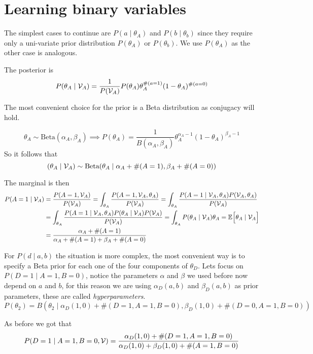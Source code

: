 \section{Learning binary variables}

The simplest cases to continue are \(P(a\mid \theta_{A})\) and
\(P(b \mid \theta_{b})\) since they require only a uni-variate prior distribution
\(P(\theta_{A})\) or \(P(\theta_{b})\). We use \(P(\theta_{A})\) as the other
case is analogous.

The posterior is
\[
  P(\theta_{A} \mid \mathcal{V}_{A}) = \frac{1}{P(\mathcal{V}_{A})}P(\theta_{A})\theta_{A}^{\#(a=1)}(1-\theta_{A})^{\#(a=0)}
\]

The most convenient choice for the prior is a Beta distribution as conjugacy
will hold.

\[
  \theta_{A} \sim \text{Beta}(\alpha_{A}, \beta_{A}) \implies P(\theta_{A})  = \frac{1}{B(\alpha_{A}, \beta_{A})}\theta_{A}^{\alpha_{A}-1}(1-\theta_{A})^{\beta_{A} - 1}
\]
So it follows that
\[
  (\theta_{A} \mid \mathcal{V}_{A}) \sim \text{Beta}(\theta_{A} \mid \alpha_{A} + \#(A=1), \beta_{A} + \#(A = 0))
\]

The marginal is then
\[
  \begin{aligned}
    P(A = 1 \mid \mathcal{V}_{A})
    &= \frac{P(A = 1, \mathcal{V}_{A})}{P(\mathcal{V}_{A})} = \int_{\theta_{A}}  \frac{P(A = 1, \mathcal{V}_{A}, \theta_{A})}{P(\mathcal{V}_{A})} =  \int_{\theta_{A}}  \frac{P(A = 1 \mid \mathcal{V}_{A}, \theta_{A}) P(\mathcal{V}_{A}, \theta_{A})}{P(\mathcal{V}_{A})} \\
    &=  \int_{\theta_{A}}  \frac{P(A = 1 \mid \mathcal{V}_{A}, \theta_{A}) P(\theta_{A} \mid \mathcal{V}_{A})P(\mathcal{V}_{A})}{P(\mathcal{V}_{A})} = \int_{\theta_{A}}P(\theta_{A}\mid \mathcal{V}_{A})\theta_{A} = \mathbb{E}_{}\Big[\theta_{A} \mid \mathcal{V}_{A}\Big] \\
    &= \frac{\alpha_{A} + \#(A= 1)}{\alpha_{A} + \#(A=1) + \beta_{A} + \#(A=0)}
  \end{aligned}
\]

For \(P(d \mid a ,b)\) the situation is more complex, the most convenient way is
to specify a Beta prior for each one of the four components of \(\theta_{D}\).
Lets focus on \(P(D = 1 \mid A = 1, B = 0)\), notice the parameters \(\alpha\)
and \(\beta\) we used before now depend on \(a\) and \(b\), for this reason we
are using \(\alpha_{D}(a,b)\) and \(\beta_{D}(a,b)\) as prior parameters, these
are called \emph{hyperparameters}.
\[
  P(\theta_{2}) = B(\theta_{2} \mid \alpha_{D}(1,0) + \#(D = 1, A = 1, B = 0), \beta_{D}(1,0) + \#(D = 0, A = 1, B = 0))
\]

As before we got that
\[
  P(D = 1 \mid A = 1, B = 0, \mathcal{V}) = \frac{\alpha_{D}(1,0) + \#(D = 1, A = 1, B = 0)}{\alpha_{D}(1,0) + \beta_{D}(1,0) + \#(A=1, B = 0)}
\]

